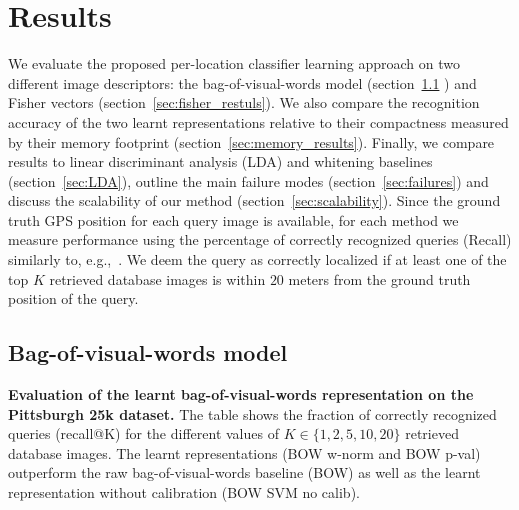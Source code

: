\section{Results}
\label{sec:results}
  We evaluate the proposed per-location classifier learning approach on two different image descriptors: the bag-of-visual-words model (section~\ref{sec:bow_results} ) and Fisher vectors (section~\ref{sec:fisher_restuls}).  We also compare the recognition accuracy of the two learnt representations relative to their compactness measured by their memory footprint (section~\ref{sec:memory_results}).
 \textcolor{petr}{Finally, we compare results to linear discriminant analysis (LDA) and whitening baselines (section~\ref{sec:LDA}), outline the main failure modes (section~\ref{sec:failures}) and discuss the scalability of our method (section~\ref{sec:scalability}).  } 
  Since the ground truth GPS position for each query image is available, for each method we measure performance using the percentage of correctly recognized queries (Recall) similarly to, e.g.,~\cite{Chen11,Knopp2010,Sattler-BMVC12}. We deem the query as correctly localized if at least one of the top $K$ retrieved database images is within $20$ meters from the ground truth position of the query. 


  \subsection{Bag-of-visual-words model}
  \label{sec:bow_results}
  
    \begin{table}[tbp]
      \begin{centering}
        
        \caption{ 
          \textbf{Evaluation of the learnt bag-of-visual-words representation on the Pittsburgh 25k dataset.}
          The table shows the fraction of correctly recognized queries (recall@K) for the different values of $K\in\{1,2,5,10,20\}$ retrieved database images. 
          The learnt representations (BOW w-norm and BOW p-val) outperform the raw bag-of-visual-words baseline (BOW) as well as the learnt representation without calibration (BOW SVM no calib).  
        }
        \label{tab:recallBOW}
      \end{centering}
    \end{table}

